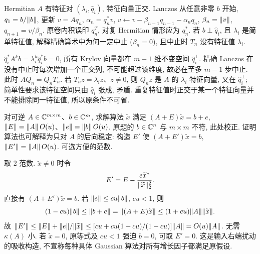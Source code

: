 \begin{exercise}\label{e2009:q2}
Hermitian $A$ 有特征对 $(\lambda_i,\widehat q_i)$, 特征向量正交. Lanczos 从任意非零 $b$ 开始, $q_1=b/\lVert b\rVert$, 更新 $v=Aq_n$, $\alpha_n=q_n^*v$, $v\leftarrow v-\beta_{n-1}q_{n-1}-\alpha_nq_n$, $\beta_n=\lVert v\rVert$, $q_{n+1}=v/\beta_n$. 原卷内积误印 $q_n^T$, 对复 Hermitian 情形应为 $q_n^*$. 若 $b\perp\widehat q_i$, 且 $\lambda_i$ 是简单特征值, 解释精确算术中为何一定中止 ($\beta_n=0$), 且中止时 $T_n$ 没有特征值 $\lambda_i$.
\end{exercise}
\begin{solution}
$\widehat q_i^*A^kb=\lambda_i^k\widehat q_i^*b=0$, 所有 Krylov 向量都在 $m-1$ 维不变空间 $\widehat q_i^\perp$. 精确 Lanczos 在没有中止时每次增加一个正交列, 不可能超过该维度, 故必在至多 $m-1$ 步中止. 此时 $AQ_n=Q_nT_n$. 若 $T_nz=\lambda_i z$、$z\ne0$, 则 $Q_nz$ 是 $A$ 的 $\lambda_i$ 特征向量, 又在 $\widehat q_i^\perp$; 简单性要求该特征空间只由 $\widehat q_i$ 张成, 矛盾. 重复特征值时正交于某一个特征向量并不能排除同一特征值, 所以原条件不可省.
\end{solution}
\begin{exercise}\label{e2009:q3}
对可逆 $A\in\mathbb C^{m\times m}$、$b\in\mathbb C^m$, 求解算法 $\widetilde x$ 满足 $(A+E)\widetilde x=b+e$, $\lVert E\rVert=\lVert A\rVert\,O(u)$、$\lVert e\rVert=\lVert b\rVert\,O(u)$. 原题的 $b\in\mathbb C^n$ 与 $m\times m$ 不符, 此处校正. 证明算法也可解释为只对 $A$ 的后向稳定: 构造 $E'$ 使 $(A+E')\widetilde x=b$, $\lVert E'\rVert=\lVert A\rVert\,O(u)$. 可选方便的范数.
\end{exercise}
\begin{solution}
取 2 范数. $\widetilde x\ne0$ 时令
\[
 E'=E-\frac{e\widetilde x^*}{\lVert \widetilde x\rVert_2^2}.
\]
直接有 $(A+E')\widetilde x=b$. 若 $\lVert e\rVert\le cu\lVert b\rVert$, $cu<1$, 则
\[
 (1-cu)\lVert b\rVert\le\lVert b+e\rVert=\lVert (A+E)\widetilde x\rVert
 \le(1+cu)\lVert A\rVert\lVert \widetilde x\rVert.
\]
故 $\lVert E'\rVert\le\lVert E\rVert+\lVert e\rVert/\lVert \widetilde x\rVert\le[cu+cu(1+cu)/(1-cu)]\lVert A\rVert=O(u)\lVert A\rVert$. 无需 $\kappa(A)$ 小. 若 $\widetilde x=0$, 原等式及 $cu<1$ 强迫 $b=0$, 可取 $E'=0$. 这是输入右端扰动的吸收构造, 不宣称每种具体 Gaussian 算法对所有增长因子都满足原假设.
\end{solution}
